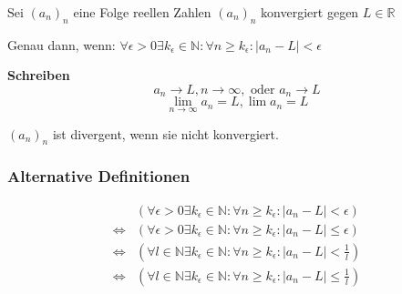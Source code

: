 \documentclass[fleqn]{scrbook}
\newcommand{\R}{\mathbb{R}}
\newcommand{\N}{\mathbb{N}}
\begin{document}
Sei $(a_n)_n$ eine Folge reellen Zahlen $(a_n)_n$ konvergiert gegen $L \in \R$

Genau dann, wenn: $\forall \epsilon > 0 \exists k_\epsilon \in \N: \forall n \geq k_\epsilon: |a_n - L| < \epsilon$

\textbf{Schreiben} 
\[a_n \to L, n\to \infty, \text{ oder } a_n \to L\]
\[\lim_{n \to \infty} a_n = L, \lim a_n = L\]

$(a_n)_n$ ist divergent, wenn sie nicht konvergiert.

\subsubsection{Alternative Definitionen} 

\begin{align*}
                      & \left(\forall \epsilon > 0 \exists k_\epsilon \in \N: \forall n \geq k_\epsilon: |a_n - L| < \epsilon \right) \\
  \Longleftrightarrow & \left(\forall \epsilon > 0 \exists k_\epsilon \in \N: \forall n \geq k_\epsilon: |a_n - L| \leq \epsilon \right) \\
  \Longleftrightarrow & \left(\forall l \in \N \exists k_\epsilon \in \N: \forall n \geq k_\epsilon: |a_n - L| < \frac{1}{l} \right) \\
  \Longleftrightarrow & \left(\forall l \in \N \exists k_\epsilon \in \N: \forall n \geq k_\epsilon: |a_n - L| \leq \frac{1}{l} \right) 
\end{align*}
\end{document}
